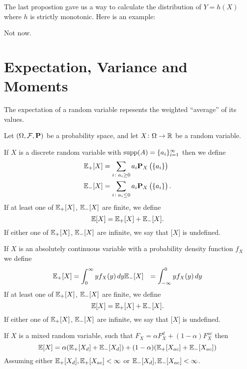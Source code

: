 \documentclass[11pt,a4paper]{article}
\begin{document}
  The last propostion gave us a way to calculate the distribution of
  $Y = h(X)$ where $h$ is strictly monotonic. Here is an example:
  \begin{example}
    Not now.
  \end{example}

  \newpage

  \section{Expectation, Variance and Moments}

  The expectation of a random variable repesents the weighted ``average'' of 
  its values.

  \begin{definition}[Expectation]
    Let $(\Omega, \mathcal F, \mathbf{P})$ be a probability space,
    and let $X \colon \Omega \to \mathbb{R}$ be a random variable.

    If $X$ is a discrete random variable with 
    $\operatorname{supp}(A) = \{a_i\}_{i=1}^{\infty}$ then we define
    \begin{align*}
      \mathbb{E}_{+}[X] &=
      \sum_{i \colon a_i \geq 0} a_i \mathbf{P}_X\left(\{a_i\}\right) \\
      \mathbb{E}_{-}[X] &=
      \sum_{i \colon a_i \le 0} a_i \mathbf{P}_X\left(\{a_i\}\right).
    \end{align*}
    If at least one of $\mathbb{E}_{+}[X]$, $\mathbb{E}_{-}[X]$ are finite, 
    we define
    \[
      \mathbb{E}[X] = \mathbb{E}_{+}[X] + \mathbb{E}_{-}[X].
    \]
    If either one of $\mathbb{E}_{+}[X]$, $\mathbb{E}_{-}[X]$ are infinite,
    we say that $\mathbf [X]$ is undefined.

    If $X$ is an absolutely continuous variable with a probability density
    function $f_X$ we define
    \begin{align*}
      \mathbb{E}_{+}[X] &=
      \int_{0}^{\infty} y f_X(y)\,dy
      \mathbb{E}_{-}[X] &=
      \int_{-\infty}^{0} y f_X(y)\,dy
    \end{align*}
    If at least one of $\mathbb{E}_{+}[X]$, $\mathbb{E}_{-}[X]$ are finite, 
    we define
    \[
      \mathbb{E}[X] = \mathbb{E}_{+}[X] + \mathbb{E}_{-}[X].
    \]
    If either one of $\mathbb{E}_{+}[X]$, $\mathbb{E}_{-}[X]$ are infinite,
    we say that $\mathbf [X]$ is undefined.

    If $X$ is a mixed random variable, such that 
    $F_X = \alpha F_X^d + (1-\alpha)F_X^{ac}$ then
    \[
      \mathbb{E}[X] = 
      \alpha (\mathbb{E}_{+}[X_d] + \mathbb{E}_{-}[X_d]) +
      (1 - \alpha) (\mathbb{E}_{+}[X_{ac}] + \mathbb{E}_{-}[X_{ac}])
    \]
    Assuming either $\mathbb{E}_+[X_{d}], \mathbb{E}_+[X_{ac}] < \infty$ or
    $\mathbb{E}_-[X_{d}], \mathbb{E}_-[X_{ac}] < \infty$.
  \end{definition}
  
\end{document}
